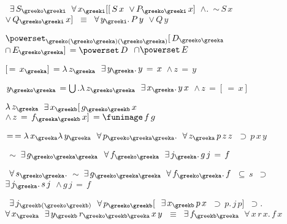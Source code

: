 \begin{description}
\item[\parbox{\textwidth}{X5208\index{X5208@X5208, {\bf Theorem}} }] \texttt{$ $ $\exists \,S_{\greeko\greeki} $ $\forall \,x_{\greeki} [ [ \,S \,x $ $\lor \,P_{\greeko\greeki} \,x ] $ $\land . $ $\sim \,S \,x $ $\lor \,Q_{\greeko\greeki} \,x ] $ $\equiv $ $\forall \,y_{\greeki} . \,P \,y $ $\lor \,Q \,y$}


\item[\parbox{\textwidth}{X5209\index{X5209@X5209, {\bf Theorem}} }] \texttt{$ \powerset_{\greeko(\greeko\greeka)(\greeko\greeka)} [ \,D_{\greeko\greeka} $ $\cap \,E_{\greeko\greeka} ] \,= \powerset \,D $ $\cap \powerset \,E$}


\item[\parbox{\textwidth}{X5210\index{X5210@X5210, {\bf Theorem}} }] \texttt{$ [ \,= \,x_{\greeka} ] \,= \lambda \,z_{\greeka} $ $\exists \,y_{\greeka} . \,y \,= \,x $ $\land \,z \,= \,y$}


\item[\parbox{\textwidth}{X5211\index{X5211@X5211, {\bf Theorem}} }] \texttt{$ \,y_{\greeko\greeka} \,= \bigcup . \lambda \,z_{\greeko\greeka} $ $\exists \,x_{\greeka} . \,y \,x $ $\land \,z \,= [ \,= \,x ]$}


\item[\parbox{\textwidth}{X5212\index{X5212@X5212, {\bf Theorem}} }] \texttt{$ \lambda \,z_{\greeka} $ $\exists \,x_{\greekb} [ \,g_{\greeko\greekb} \,x $ $\land \,z \,= \,f_{\greeka\greekb} \,x ] \,= \funimage \,f \,g$}


\item[\parbox{\textwidth}{X5303\index{X5303@X5303, {\bf Theorem}} }] \texttt{$ \,= \,= \lambda \,x_{\greeka} \lambda \,y_{\greeka} $ $\forall \,p_{\greeko\greeka\greeka} . $ $\forall \,z_{\greeka} \,p \,z \,z $ $\supset \,p \,x \,y$}


\item[\parbox{\textwidth}{X5304\index{X5304@X5304, {\bf Theorem}} }] \texttt{$ $ $\sim $ $\exists \,g_{\greeko\greeka\greeka} $ $\forall \,f_{\greeko\greeka} $ $\exists \,j_{\greeka} . \,g \,j \,= \,f$}


\item[\parbox{\textwidth}{X5305\index{X5305@X5305, {\bf Theorem}} }] \texttt{$ $ $\forall \,s_{\greeko\greeka} . $ $\sim $ $\exists \,g_{\greeko\greeka\greeka} $ $\forall \,f_{\greeko\greeka} . \,f $ $\subseteq \,s $ $\supset $ $\exists \,j_{\greeka} . \,s \,j $ $\land \,g \,j \,= \,f$}


\item[\parbox{\textwidth}{X5308\index{X5308@X5308, {\bf Theorem}} }] \texttt{$ $ $\exists \,j_{\greekb(\greeko\greekb)} $ $\forall \,p_{\greeko\greekb} [ $ $\exists \,x_{\greekb} \,p \,x $ $\supset \,p . \,j \,p ] $ $\supset . $ $\forall \,x_{\greeka} $ $\exists \,y_{\greekb} \,r_{\greeko\greekb\greeka} \,x \,y $ $\equiv $ $\exists \,f_{\greekb\greeka} $ $\forall \,x \,r \,x . \,f \,x$}



\end{description}
